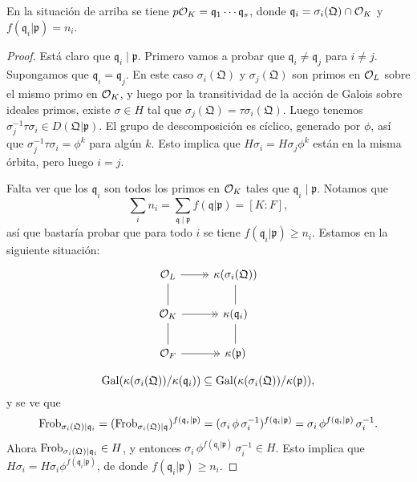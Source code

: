 \begin{teorema}
  En la situación de arriba se tiene
  $p \mathcal{O}_K = \mathfrak{q}_1\cdots \mathfrak{q}_s$, donde
  $\mathfrak{q}_i = \sigma_i (\mathfrak{Q}) \cap \mathcal{O}_K$ y
  $f (\mathfrak{q}_i|\mathfrak{p}) = n_i$.

  \begin{proof}
    Está claro que $\mathfrak{q}_i \mid \mathfrak{p}$. Primero vamos a probar
    que $\mathfrak{q}_i \ne \mathfrak{q}_j$ para $i \ne j$. Supongamos que
    $\mathfrak{q}_i = \mathfrak{q}_j$. En este caso
    $\sigma_i (\mathfrak{Q})$ y $\sigma_j (\mathfrak{Q})$ son primos en $\mathcal{O}_L$
    sobre el mismo primo en $\mathcal{O}_K$, y luego por la transitividad de la acción
    de Galois sobre ideales primos, existe $\sigma \in H$ tal que
    $\sigma_j (\mathfrak{Q}) = \tau \sigma_i (\mathfrak{Q})$. Luego tenemos
    $\sigma_j^{-1} \tau \sigma_i \in D (\mathfrak{Q}|\mathfrak{p})$.
    El grupo de descomposición es cíclico, generado por $\phi$, así que
    $\sigma_j^{-1} \tau \sigma_i = \phi^k$ para algún $k$. Esto implica que
    $H \sigma_i = H \sigma_j \phi^k$ están en la misma órbita, pero luego
    $i = j$.

    Falta ver que los $\mathfrak{q}_i$ son todos los primos en $\mathcal{O}_K$ tales que
    $\mathfrak{q}_i \mid \mathfrak{p}$. Notamos que
    $$\sum_i n_i = \sum_{\mathfrak{q}\mid\mathfrak{p}} f (\mathfrak{q}|\mathfrak{p}) = [K:F],$$
    así que bastaría probar que para todo $i$ se tiene
    $f (\mathfrak{q}_i|\mathfrak{p}) \ge n_i$.
    Estamos en la siguiente situación:
    \[ \begin{tikzcd}
      \O_L \ar[-]{d}\ar[->>]{r} & \kappa (\sigma_i (\mathfrak{Q}))\ar[-]{d} \\
      \O_K \ar[-]{d}\ar[->>]{r} & \kappa (\mathfrak{q}_i)\ar[-]{d} \\
      \O_F \ar[->>]{r} & \kappa (\mathfrak{p})
    \end{tikzcd} \]

    \[ \operatorname{Gal} (\kappa (\sigma_i (\mathfrak{Q}))/\kappa (\mathfrak{q}_i))
       \subseteq
       \operatorname{Gal} (\kappa (\sigma_i (\mathfrak{Q}))/\kappa (\mathfrak{p})), \]
    y se ve que
    \[ \operatorname{Frob}_{\sigma_i (\mathfrak{Q}) | \mathfrak{q}_i} =
       (\operatorname{Frob}_{\sigma_i (\mathfrak{Q}) | \mathfrak{q}})^{f (\mathfrak{q}_i|\mathfrak{p})} =
       (\sigma_i\,\phi\,\sigma_i^{-1})^{f (\mathfrak{q}_i|\mathfrak{p})} =
       \sigma_i\,\phi^{f (\mathfrak{q}_i|\mathfrak{p})}\,\sigma_i^{-1}. \]
    Ahora $\operatorname{Frob}_{\sigma_i (\mathfrak{Q}) | \mathfrak{q}_i} \in H$, y entonces
    $\sigma_i\,\phi^{f (\mathfrak{q}_i|\mathfrak{p})}\,\sigma_i^{-1} \in H$.
    Esto implica que
    $H \sigma_i = H \sigma_i \phi^{f (\mathfrak{q}_i|\mathfrak{p})}$,
    de donde $f (\mathfrak{q}_i|\mathfrak{p}) \ge n_i$.
  \end{proof}
\end{teorema}

